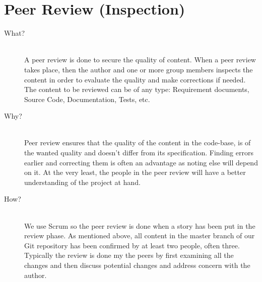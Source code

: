 \section*{Peer Review (Inspection)}
\label{sec:peerreview}
\begin{description}
    \item[What?]\hfill\\
    A peer review is done to secure the quality of content. 
    When a peer review takes place, then the author and one or more group members inspects the content in order to evaluate the quality and make corrections if needed. 
    The content to be reviewed can be of any type: Requirement documents, Source Code, Documentation, Tests, etc.
    \item[Why?]\hfill\\ 
    Peer review ensures that the quality of the content in the code-base, is of the wanted quality and doesn't differ from its specification. 
    Finding errors earlier and correcting them is often an advantage as noting else will depend on it. 
    At the very least, the people in the peer review will have a better understanding of the project at hand.
    \item[How?]\hfill\\
    We use Scrum so the peer review is done when a story has been put in the review phase. 
    As mentioned above, all content in the master branch of our Git repository has been confirmed by at least two people, often three. 
    Typically the review is done my the peers by first examining all the changes and then discuss potential changes and address concern with the author. 
\end{description}
